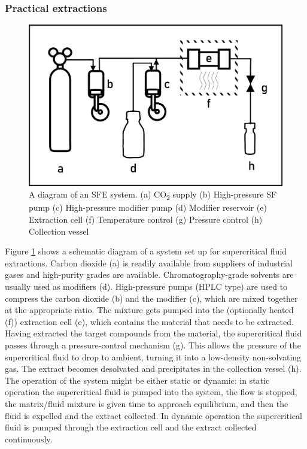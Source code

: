 \subsubsection{Practical extractions}

\begin{figure}
\centering
\includegraphics[width=\textwidth]{Figures/SFE_System}
\decoRule

\caption[SFE system diagram]{A diagram of an SFE system. (a) CO\textsubscript{2}
supply (b) High-pressure SF pump (c) High-pressure modifier pump (d) Modifier
reservoir (e) Extraction cell (f) Temperature control (g) Pressure control (h)
Collection vessel}

\label{fig:sfediagram}
\end{figure}


Figure \ref{fig:sfediagram} shows a schematic diagram of a system set up for
supercritical fluid extractions. Carbon dioxide (a) is readily available from
suppliers of industrial gases and high-purity grades are available.
Chromatography-grade solvents are usually used as modifiers (d). High-pressure
pumps (HPLC type) are used to compress the carbon dioxide (b) and the modifier
(c), which are mixed together at the appropriate ratio. The mixture gets pumped
into the (optionally heated (f)) extraction cell (e), which contains the
material that needs to be extracted. Having extracted the target compounds from
the material, the supercritical fluid passes through a pressure-control
mechanism (g). This allows the pressure of the supercritical fluid to drop to
ambient, turning it into a low-density non-solvating gas. The extract becomes
desolvated and precipitates in the collection vessel (h). The operation of the
system might be either static or dynamic: in static operation the supercritical
fluid is pumped into the system, the flow is stopped, the matrix/fluid
mixture is given time to approach equilibrium, and then the fluid is expelled and
the extract collected. In dynamic operation the supercritical fluid is pumped
through the extraction cell and the extract collected continuously.


